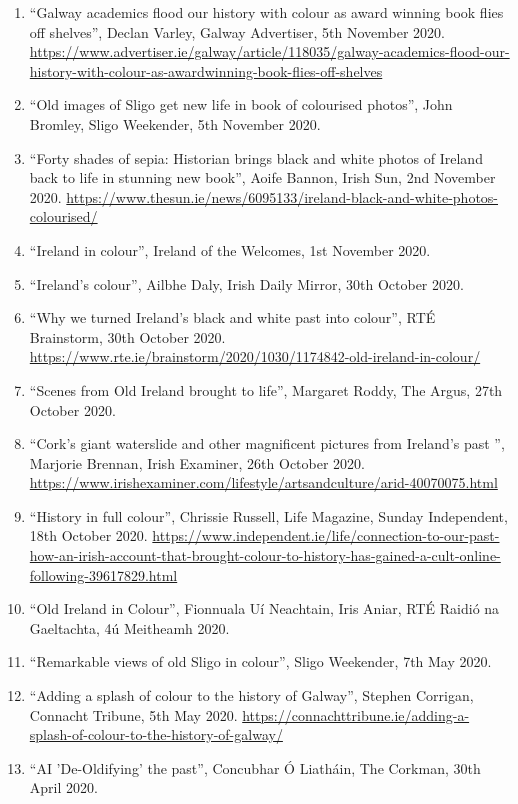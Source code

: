 \documentclass[10pt,a4paper]{res} %
\begin{document}
\begin{resume}
{\begin{enumerate}
\item ``Galway academics flood our history with colour as award winning book flies off shelves'', Declan Varley, Galway Advertiser, 5th November 2020. \url{https://www.advertiser.ie/galway/article/118035/galway-academics-flood-our-history-with-colour-as-awardwinning-book-flies-off-shelves}
\item ``Old images of Sligo get new life in book of colourised photos'', John Bromley, Sligo Weekender, 5th November 2020.
\item ``Forty shades of sepia: Historian brings black and white photos of Ireland back to life in stunning new book'', Aoife Bannon, Irish Sun, 2nd November 2020. \url{https://www.thesun.ie/news/6095133/ireland-black-and-white-photos-colourised/}
\item ``Ireland in colour'', Ireland of the Welcomes, 1st November 2020.
\item ``Ireland's colour'', Ailbhe Daly, Irish Daily Mirror, 30th October 2020.
\item ``Why we turned Ireland's black and white past into colour'', RT\'{E} Brainstorm, 30th October 2020. \url{https://www.rte.ie/brainstorm/2020/1030/1174842-old-ireland-in-colour/}
\item ``Scenes from Old Ireland brought to life'', Margaret Roddy, The Argus, 27th October 2020.
\item ``Cork's giant waterslide and other magnificent pictures from Ireland's past '', Marjorie Brennan, Irish Examiner, 26th October 2020. \url{https://www.irishexaminer.com/lifestyle/artsandculture/arid-40070075.html}
\item ``History in full colour'', Chrissie Russell, Life Magazine, Sunday Independent, 18th October 2020. \url{https://www.independent.ie/life/connection-to-our-past-how-an-irish-account-that-brought-colour-to-history-has-gained-a-cult-online-following-39617829.html}
\item ``Old Ireland in Colour'', Fionnuala U\'{i} Neachtain, Iris Aniar, RT\'{E} Raidi\'{o} na Gaeltachta, 4\'{u} Meitheamh 2020.
\item ``Remarkable views of old Sligo in colour'', Sligo Weekender, 7th May 2020.
\item ``Adding a splash of colour to the history of Galway'', Stephen Corrigan, Connacht Tribune, 5th May 2020. \url{https://connachttribune.ie/adding-a-splash-of-colour-to-the-history-of-galway/}
\item ``AI 'De-Oldifying' the past'', Concubhar \'{O} Liath\'{a}in, The Corkman, 30th April 2020.

\end{enumerate}}
\end{resume}
\end{document}
